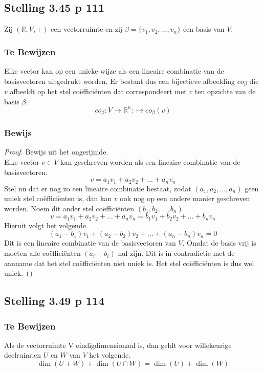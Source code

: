 \documentclass[lineaire_algebra_oplossingen.tex]{subfiles}
\begin{document}
\subsection{Stelling 3.45 p 111}
\label{3.45}
Zij $(\mathbb{R},V,+)$ een vectorruimte en zij $\beta = \{v_1,v_2,...,v_n\}$ een basis van $V$.

\subsubsection*{Te Bewijzen}
Elke vector kan op een unieke wijze als een lineaire combinatie van de basisvectoren uitgedrukt worden. Er bestaat dus een bijectieve afbeelding $co_{\beta}$ die $v$ afbeeldt op het stel co\"effici\"enten dat correspondeert met $v$ ten opzichte van de basis $\beta$.
\[
co_{\beta}: V \rightarrow \mathbb{R}^n
 : \mapsto co_{\beta}(v)\]
 
\subsubsection*{Bewijs}
\begin{proof}
Bewijs uit het ongerijmde.\\
Elke vector $v\in V$ kan geschreven worden als een lineaire combinatie van de basisvectoren.
\[
v = a_1v_1 + a_2v_2 + ... + a_nv_n
\]
Stel nu dat er nog zo een lineaire combinatie bestaat, zodat $(a_1,a_2,...,a_n)$ geen uniek stel co\"effici\"enten is, dan kan $v$ ook nog op een andere manier geschreven worden. Noem dit ander stel co\"effici\"enten $(b_1,b_2,...,b_n)$.
\[
v = a_1v_1 + a_2v_2 + ... + a_nv_n = b_1v_1 + b_2v_2 + ... + b_nv_n
\]
Hieruit volgt het volgende.
\[ 
(a_1-b_1)v_1 + (a_2-b_2)v_2 + ... + (a_n-b_n)v_n= 0
\]
Dit is een lineaire combinatie van de basisvectoren van $V$. Omdat de basis vrij is moeten alle co\"effici\"enten $(a_i-b_i)$ nul zijn. Dit is in contradictie met de aanname dat het stel co\"effici\"enten niet uniek is. Het stel co\"effici\"enten is dus wel uniek.
\end{proof}


\subsection{Stelling 3.49 p 114}
\label{3.49}
\subsubsection*{Te Bewijzen}
Als de vectorruimte V eindigdimensionaal is, dan geldt voor willekeurige deelruimten $U$ en $W$ van $V$ het volgende.
\[
\dim(U+W) + \dim(U\cap W) = \dim(U) + \dim(W)
\]
\end{document}
